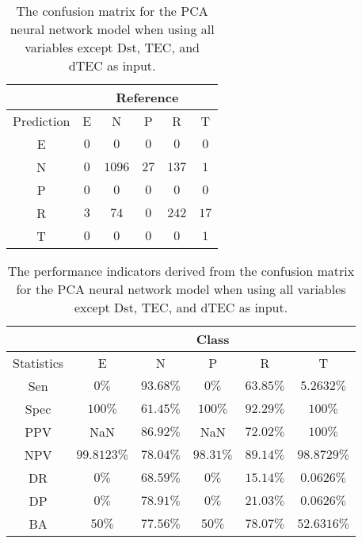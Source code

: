 \begin{table}[!ht]
	\centering
	\begin{tabular}{|c|c|c|c|c|c|}
		\hline
		 & \multicolumn{5}{|c|}{Reference} \\ \hline
		 Prediction & E & N & P & R & T \\ \hline
		 E & $0$ & $0$ & $0$ & $0$ & $0$ \\ \hline
		 N & $0$ & $1096$ & $27$ & $137$ & $1$ \\ \hline
		 P & $0$ & $0$ & $0$ & $0$ & $0$ \\ \hline
		 R & $3$ & $74$ & $0$ & $242$ & $17$ \\ \hline
		 T & $0$ & $0$ & $0$ & $0$ & $1$ \\ \hline
	\end{tabular}
	\caption{The confusion matrix for the PCA neural network model when using all variables except Dst, TEC, and dTEC as input.}
	\label{tab:cm:noTEC:pcaNNet}
\end{table}

\begin{table}[!ht]
	\centering
	\begin{tabular}{|c|c|c|c|c|c|}
		\hline
		 & \multicolumn{5}{c|}{Class} \\ \hline
		Statistics & E & N & P & R & T \\ \hline
		Sen & $0\%$ & $93.68\%$ & $0\%$ & $63.85\%$ & $5.2632\%$ \\ \hline
		Spec & $100\%$ & $61.45\%$ & $100\%$ & $92.29\%$ & $100\%$ \\ \hline
		PPV & NaN & $86.92\%$ & NaN & $72.02\%$ & $100\%$ \\ \hline
		NPV & $99.8123\%$ & $78.04\%$ & $98.31\%$ & $89.14\%$ & $98.8729\%$ \\ \hline
		DR & $0\%$ & $68.59\%$ & $0\%$ & $15.14\%$ & $0.0626\%$ \\ \hline
		DP & $0\%$ & $78.91\%$ & $0\%$ & $21.03\%$ & $0.0626\%$ \\ \hline
		BA & $50\%$ & $77.56\%$ & $50\%$ & $78.07\%$ & $52.6316\%$ \\ \hline
	\end{tabular}
	\caption{The performance indicators derived from the confusion matrix for the PCA neural network model when using all variables except Dst, TEC, and dTEC as input.}
	\label{tab:cs:reverse:noTEC:pcaNNet}
\end{table}

